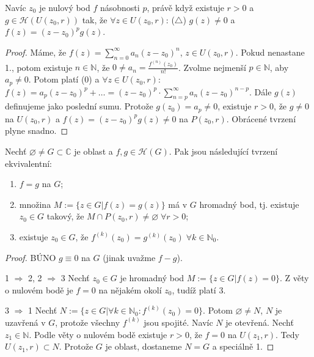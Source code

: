 \begin{note}
Navíc $z_0$ je nulový bod $f$ násobnosti $p$, právě když existuje $r>0$ a $g \in \mathcal{H}(U(z_0,r))$ tak, že $\forall z \in U(z_0,r)$: ($\triangle$) $g(z) \neq 0$ a $f(z)=(z-z_0)^pg(z)$.
\end{note}

\begin{proof}
Máme, že $f(z)=\sum\limits _{n=0} ^{\infty} a_n(z-z_0)^n$, $z \in U(z_0,r)$. Pokud nenastane 1., potom existuje $n \in \mathbb{N}$, že $0 \neq a_n=\frac{f^{(n)}(z_0)}{n!}$. Zvolme nejmenší $p \in \mathbb{N}$, aby $a_p \neq 0$. Potom platí (0) a $\forall z \in U(z_0,r)$: $f(z)=a_p(z-z_0)^p + \ldots = (z-z_0)^p \cdot \sum\limits_{n=p}^\infty a_n(z-z_0)^{n-p}$. Dále $g(z)$ definujeme jako poslední sumu. Protože $g(z_0)=a_p \neq 0$, existuje $r>0$, že $g \neq 0$ na $U(z_0,r)$ a $f(z)=(z-z_0)^pg(z) \neq 0$ na $P(z_0,r)$. Obrácené tvrzení plyne snadno.
\end{proof}

\begin{theorem}
Nechť $\varnothing \neq G \subset \mathbb{C}$ je oblast a $f,g \in \mathcal{H}(G)$. Pak jsou následující tvrzení ekvivalentní:
\begin{enumerate}
\item $f=g$ na $G$;
\item množina $M:=\{z \in G | f(z)=g(z) \}$ má v $G$ hromadný bod, tj. existuje $z_0 \in G$ takový, že $M \cap P(z_0,r) \neq \varnothing \; \forall  r>0$;
\item existuje $z_0 \in G$, že $f^{(k)}(z_0)=g^{(k)}(z_0) \; \forall k \in \mathbb{N}_0$.
\end{enumerate}
\end{theorem}

\begin{proof}
BÚNO $g \equiv 0$ na $G$ (jinak uvažme $f-g$).

1 $\Rightarrow$ 2, 2 $\Rightarrow$ 3 Nechť $z_0 \in G$ je hromadný bod $M:=\{z \in G | f(z)=0 \}$. Z věty o nulovém bodě je $f=0$ na nějakém okolí $z_0$, tudíž platí 3.

3 $\Rightarrow$ 1 Nechť $N:=\{z \in G | \forall k \in \mathbb{N}_0: f^{(k)}(z_0)=0 \}$. Potom $\varnothing \neq N$, $N$ je uzavřená v $G$, protože všechny $f^{(k)}$ jsou spojité. Navíc $N$ je otevřená. Nechť $z_1 \in \mathbb{N}$. Podle věty o nulovém bodě existuje $r>0$, že $f=0$ na $U(z_1,r)$. Tedy $U(z_1,r) \subset N$. Protože $G$ je oblast, dostaneme $N=G$ a speciálně 1.
\end{proof}


